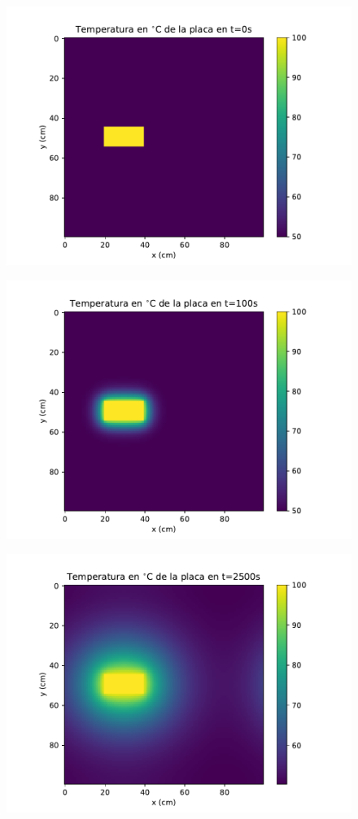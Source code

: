\documentclass[12pt,letterpaper]{article}
\begin{document}
\begin{figure}[H]
\includegraphics{p2_0.pdf}
\centering
\end{figure}

\begin{figure}[H]
\includegraphics{p2_100.pdf}
\centering
\end{figure}

\begin{figure}[H]
\includegraphics{p2_2500.pdf}
\centering
\end{figure}
\end{document}
